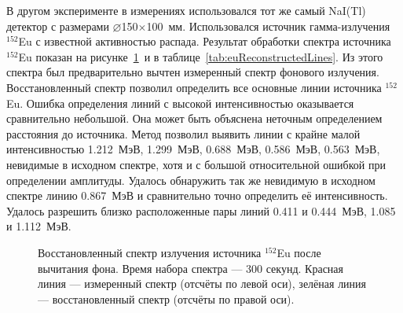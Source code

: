 В другом эксперименте в измерениях использовался тот же самый NaI(Tl) детектор с размерами $\varnothing$150$\times$100~мм. Использовался источник гамма-излучения ${}^{152}$Eu с известной активностью распада. Результат обработки спектра источника ${}^{152}$Eu показан на рисунке~\ref{fig:euReconstructedSpectrum} и в таблице~\ref{tab:euReconstructedLines}. Из этого спектра был предварительно вычтен измеренный спектр фонового излучения. Восстановленный спектр позволил определить все основные линии источника ${}^{152}$Eu. Ошибка определения линий с высокой интенсивностью оказывается сравнительно небольшой. Она может быть объяснена  неточным  определением расстояния до источника. Метод позволил выявить линии с крайне малой интенсивностью 1.212~МэВ, 1.299~МэВ, 0.688~МэВ, 0.586~МэВ, 0.563~МэВ, невидимые в исходном спектре, хотя и с большой относительной ошибкой при определении амплитуды. Удалось обнаружить так же невидимую в исходном спектре линию 0.867~МэВ и сравнительно точно определить её интенсивность. Удалось разрешить близко расположенные пары линий 0.411 и 0.444~МэВ, 1.085 и 1.112~МэВ.~\cite{Khilkevitch2013}

\begin{figure}[ht!]
  \caption{ Восстановленный спектр излучения источника ${}^{152}$Eu после вычитания фона. Время набора спектра --- 300 секунд. Красная линия --- измеренный спектр (отсчёты по левой оси), зелёная линия --- восстановленный спектр (отсчёты по правой оси).~\cite{Khilkevitch2013} }
  \label{fig:euReconstructedSpectrum}
\end{figure}

